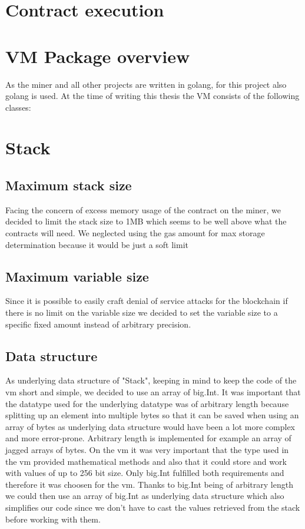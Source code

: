 \section{Contract execution}

\section{VM Package overview}
As the miner and all other projects are written in golang, for this project also golang is used.
At the time of writing this thesis the VM consists of the following classes:

\section{Stack}


\subsection{Maximum stack size}
Facing the concern of excess memory usage of the contract on the miner, we decided to limit the stack size to 1MB which seems to be well above what the contracts will need. We neglected using the gas amount for max storage determination because it would be just a soft limit

\subsection{Maximum variable size}
Since it is possible to easily craft denial of service attacks for the blockchain if there is no limit on the variable size we decided to set the variable size to a specific fixed amount instead of arbitrary precision.

\subsection{Data structure}
As underlying data structure of "Stack", keeping in mind to keep the code of the vm short and simple, we decided to use an array of big.Int. It was important that the datatype used for the underlying datatype was of arbitrary length because splitting up an element into multiple bytes so that it can be saved when using an array of bytes as underlying data structure would have been a lot more complex and more error-prone. Arbitrary length is implemented for example an array of jagged arrays of bytes. On the vm it was very important that the type used in the vm provided mathematical methods and also that it could store and work with values of up to 256 bit size. Only big.Int fulfilled both requirements and therefore it was choosen for the vm. Thanks to big.Int being of arbitrary length we could then use an array of big.Int as underlying data structure which also simplifies our code since we don't have to cast the values retrieved from the stack before working with them.

